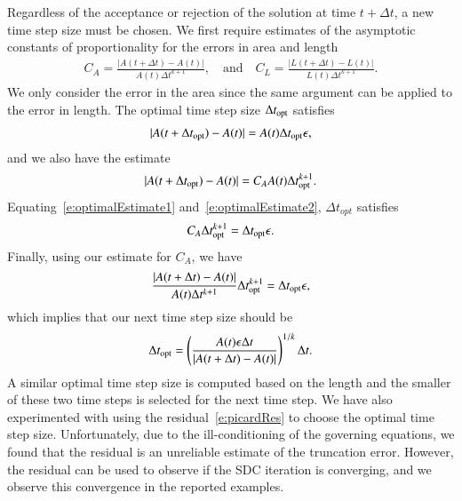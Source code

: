 Regardless of the acceptance or rejection of the solution at time $t +
\Delta t$, a new time step size must be chosen.  We first require
estimates of the asymptotic constants of proportionality for the errors
in area and length
\begin{align*}
  C_{A} = \frac{|A(t+\Delta t) - A(t)|}{A(t)\Delta t^{k+1}}, 
  \quad \text{and} \quad
  C_{L} = \frac{|L(t+\Delta t) - L(t)|}{L(t)\Delta t^{k+1}}.
\end{align*}
We only consider the error in the area since the same argument can be
applied to the error in length.  The optimal time step size $\Delta
t_{{\mathrm{opt}}}$ satisfies
\begin{align}
  |A(t+\Delta t_{{\mathrm{opt}}}) - A(t)| = A(t) \Delta t_{{\mathrm{opt}}} \epsilon,
  \label{e:optimalEstimate1}
\end{align}
and we also have the estimate
\begin{align}
  |A(t+\Delta t_{{\mathrm{opt}}}) - A(t)| = C_{A} A(t) \Delta t_{{\mathrm{opt}}}^{k+1}.
  \label{e:optimalEstimate2}
\end{align}
Equating~\eqref{e:optimalEstimate1} and~\eqref{e:optimalEstimate2},
$\Delta t_{opt}$ satisfies 
\begin{align*}
  C_{A} \Delta t_{{\mathrm{opt}}}^{k+1} = \Delta t_{{\mathrm{opt}}} \epsilon.
\end{align*}
Finally, using our estimate for $C_{A}$, we have
\begin{align*}
  \frac{|A(t+\Delta t) - A(t)|}{A(t) \Delta t^{k+1}} 
      \Delta t_{{\mathrm{opt}}}^{k+1} = \Delta t_{{\mathrm{opt}}} \epsilon, 
\end{align*}
which implies that our next time step size should be
\begin{align}
  \Delta t_{{\mathrm{opt}}} = \left(
    \frac{A(t) \epsilon \Delta t}{|A(t+\Delta t) - A(t)|}\right)^{1/k}
    \Delta t.
  \label{e:dtOpt}
\end{align}
A similar optimal time step size is computed based on the length and
the smaller of these two time steps is selected for the next time step.
We have also experimented with using the residual~\eqref{e:picardRes} to
choose the optimal time step size.  Unfortunately, due to the
ill-conditioning of the governing equations, we found that the residual
is an unreliable estimate of the truncation error.  However, the
residual can be used to observe if the SDC iteration is converging, and
we observe this convergence in the reported examples.

